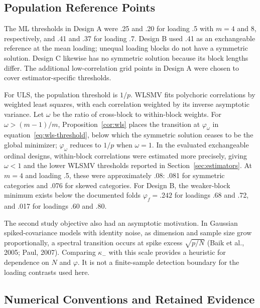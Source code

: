 \subsection{Population Reference Points}

The ML thresholds in Design A were .25 and .20 for loading .5 with $m=4$ and 8, respectively, and .41 and .37 for loading .7. Design B used .41 as an exchangeable reference at the mean loading; unequal loading blocks do not have a symmetric solution. Design C likewise has no symmetric solution because its block lengths differ. The additional low-correlation grid points in Design A were chosen to cover estimator-specific thresholds.

For ULS, the population threshold is $1/p$. WLSMV fits polychoric correlations by weighted least squares, with each correlation weighted by its inverse asymptotic variance. Let $\omega$ be the ratio of cross-block to within-block weights. For $\omega>(m-1)/m$, Proposition~\ref{cor:wls} places the transition at $\varphi_\omega$ in equation~\eqref{eq:wls-threshold}, below which the symmetric solution ceases to be the global minimizer; $\varphi_\omega$ reduces to $1/p$ when $\omega=1$. In the evaluated exchangeable ordinal designs, within-block correlations were estimated more precisely, giving $\omega<1$ and the lower WLSMV thresholds reported in Section~\ref{sec:estimators}. At $m=4$ and loading .5, these were approximately .08: .081 for symmetric categories and .076 for skewed categories. For Design B, the weaker-block minimum exists below the documented folds $\varphi_f=.242$ for loadings .68 and .72, and .017 for loadings .60 and .80.

The second study objective also had an asymptotic motivation. In Gaussian spiked-covariance models with identity noise, as dimension and sample size grow proportionally, a spectral transition occurs at spike excess $\sqrt{p/N}$ (Baik et al., 2005; Paul, 2007). Comparing $\kappa_-$ with this scale provides a heuristic for dependence on $N$ and $\varphi$. It is not a finite-sample detection boundary for the loading contrasts used here.

\subsection{Numerical Conventions and Retained Evidence}
\label{supp:conventions}

